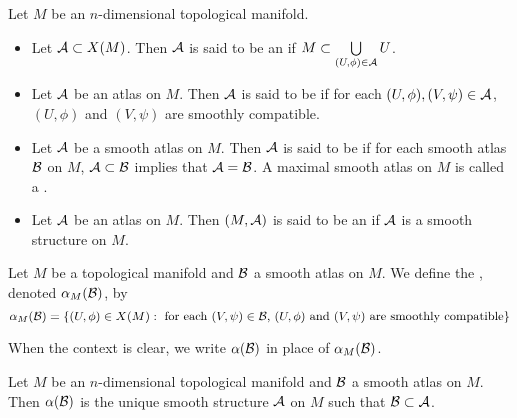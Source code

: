 \documentclass{book}
\begin{document}
	\begin{defn} Let $M$ be an $n$-dimensional topological manifold.
		\begin{itemize}
			\item Let $\mathcal{A} \subset X(M)$. Then $\mathcal{A}$ is said to be an  if  $M \subset \bigcup\limits_{(U,\phi) \in \mathcal{A}} U$.
			\item Let $\mathcal{A}$ be an atlas on $M$. Then $\mathcal{A}$ is said to be  if for each $(U, \phi), (V, \psi) \in \mathcal{A}$, $(U,\phi)$ and $(V,\psi)$ are smoothly compatible.
			\item Let $\mathcal{A}$ be a smooth atlas on $M$. Then $\mathcal{A}$ is said to be  if for each smooth atlas $\mathcal{B}$ on $M$, $\mathcal{A} \subset \mathcal{B}$ implies that $\mathcal{A} = \mathcal{B}$. A maximal smooth atlas on $M$ is called a .
			\item Let $\mathcal{A}$ be an atlas on $M$. Then $(M, \mathcal{A})$ is said to be an  if $\mathcal{A}$ is a smooth structure on $M$. 
		\end{itemize}
	\end{defn}

	\begin{defn}
		Let $M$ be a topological manifold and $\mathcal{B}$ a smooth atlas on $M$. We define the , denoted $\alpha_M(\mathcal{B})$, by 
		$$\alpha_M(\mathcal{B}) = \{(U, \phi) \in X(M): \text{ for each $(V, \psi) \in \mathcal{B}$,  $(U, \phi)$ and $(V, \psi) $ are smoothly compatible}\}$$
	\end{defn}

	\begin{note}
		When the context is clear, we write $\alpha(\mathcal{B})$ in place of $\alpha_M(\mathcal{B})$.
	\end{note}

	\begin{ex}
		Let $M$ be an $n$-dimensional topological manifold and $\mathcal{B}$ a smooth atlas on $M$. Then $\alpha(\mathcal{B})$ is the unique smooth structure $\mathcal{A}$ on $M$ such that $\mathcal{B} \subset \mathcal{A}$.
	\end{ex}
\end{document}
